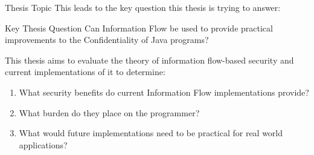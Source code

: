 %			
%			



\begin{frame}{Thesis Topic}
	This leads to the key question this thesis is trying to answer:
	
	\begin{block}{Key Thesis Question}
		Can Information Flow be used to provide practical improvements to the Confidentiality of Java programs?
	\end{block}
	
	This thesis aims to evaluate the theory of information flow-based security and current implementations of it to determine:
	
	\begin{enumerate}
		\item What security benefits do current Information Flow implementations provide?
		\item What burden do they place on the programmer?
		\item What would future implementations need to be practical for real world applications? 
	\end{enumerate}
\end{frame}